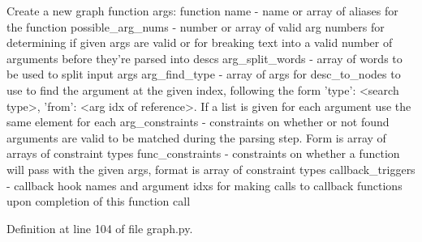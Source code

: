 \begin{DoxyVerb}Create a new graph function
args:
function name - name or array of aliases for the function
possible_arg_nums - number or array of valid arg numbers for
    determining if given args are valid or for breaking text into
    a valid number of arguments before they're parsed into descs
arg_split_words - array of words to be used to split input args
arg_find_type - array of args for desc_to_nodes to use to find the
    argument at the given index, following the form
    {'type': <search type>, 'from': <arg idx of reference>}. If a
    list is given for each argument use the same element for each
arg_constraints - constraints on whether or not found arguments are
    valid to be matched during the parsing step. Form is array of
    arrays of constraint types
func_constraints - constraints on whether a function will pass with
    the given args, format is array of constraint types
callback_triggers - callback hook names and argument idxs for making
    calls to callback functions upon completion of this function call
\end{DoxyVerb}
 

Definition at line 104 of file graph.\+py.


